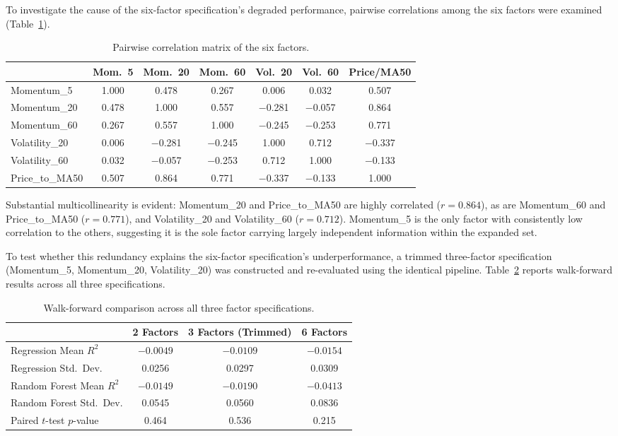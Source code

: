 \documentclass[11pt]{article}
\begin{document}
To investigate the cause of the six-factor specification's degraded performance, pairwise correlations among the six factors were examined (Table~\ref{tab:correlation}).

\begin{table}[h]
\centering
\small
\begin{tabular}{lcccccc}
\toprule
& Mom.\ 5 & Mom.\ 20 & Mom.\ 60 & Vol.\ 20 & Vol.\ 60 & Price/MA50 \\
\midrule
Momentum\_5 & 1.000 & 0.478 & 0.267 & 0.006 & 0.032 & 0.507 \\
Momentum\_20 & 0.478 & 1.000 & 0.557 & $-$0.281 & $-$0.057 & 0.864 \\
Momentum\_60 & 0.267 & 0.557 & 1.000 & $-$0.245 & $-$0.253 & 0.771 \\
Volatility\_20 & 0.006 & $-$0.281 & $-$0.245 & 1.000 & 0.712 & $-$0.337 \\
Volatility\_60 & 0.032 & $-$0.057 & $-$0.253 & 0.712 & 1.000 & $-$0.133 \\
Price\_to\_MA50 & 0.507 & 0.864 & 0.771 & $-$0.337 & $-$0.133 & 1.000 \\
\bottomrule
\end{tabular}
\caption{Pairwise correlation matrix of the six factors.}
\label{tab:correlation}
\end{table}

Substantial multicollinearity is evident: Momentum\_20 and Price\_to\_MA50 are highly correlated ($r = 0.864$), as are Momentum\_60 and Price\_to\_MA50 ($r = 0.771$), and Volatility\_20 and Volatility\_60 ($r = 0.712$). Momentum\_5 is the only factor with consistently low correlation to the others, suggesting it is the sole factor carrying largely independent information within the expanded set.

To test whether this redundancy explains the six-factor specification's underperformance, a trimmed three-factor specification (Momentum\_5, Momentum\_20, Volatility\_20) was constructed and re-evaluated using the identical pipeline. Table~\ref{tab:trimmed_comparison} reports walk-forward results across all three specifications.

\begin{table}[h]
\centering
\begin{tabular}{lccc}
\toprule
& 2 Factors & 3 Factors (Trimmed) & 6 Factors \\
\midrule
Regression Mean $R^2$ & $-0.0049$ & $-0.0109$ & $-0.0154$ \\
Regression Std.\ Dev. & 0.0256 & 0.0297 & 0.0309 \\
Random Forest Mean $R^2$ & $-0.0149$ & $-0.0190$ & $-0.0413$ \\
Random Forest Std.\ Dev. & 0.0545 & 0.0560 & 0.0836 \\
Paired $t$-test $p$-value & 0.464 & 0.536 & 0.215 \\
\bottomrule
\end{tabular}
\caption{Walk-forward comparison across all three factor specifications.}
\label{tab:trimmed_comparison}
\end{table}
\end{document}

